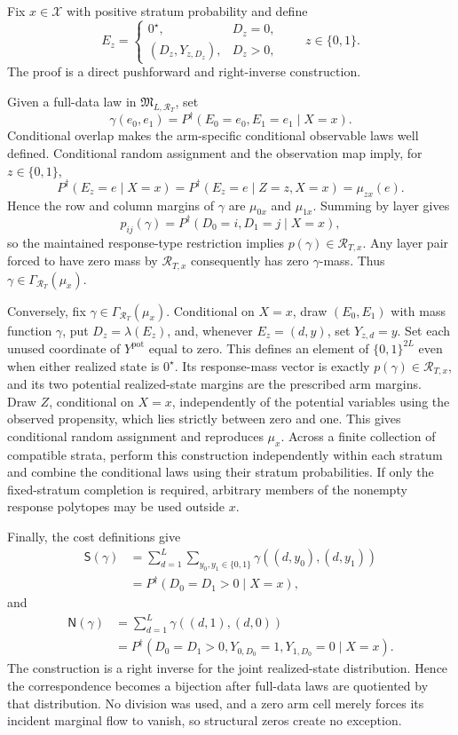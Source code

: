 Fix \(x\in\mathcal X\) with positive stratum probability and define
\[
 E_z=
 \begin{cases}
 0^{\star},&D_z=0,\\
 (D_z,Y_{z,D_z}),&D_z>0,
 \end{cases}
 \qquad z\in\{0,1\}.
\]
The proof is a direct pushforward and right-inverse construction.

Given a full-data law in \(\mathfrak M_{L,\mathcal R_T}\), set
\[
 \gamma(e_0,e_1)
 =P^{\dagger}(E_0=e_0,E_1=e_1\mid X=x).
\]
Conditional overlap makes the arm-specific conditional observable laws well defined.  Conditional random assignment and the observation map imply, for \(z\in\{0,1\}\),
\[
 P^{\dagger}(E_z=e\mid X=x)
 =P^{\dagger}(E_z=e\mid Z=z,X=x)
 =\mu_{zx}(e).
\]
Hence the row and column margins of \(\gamma\) are \(\mu_{0x}\) and \(\mu_{1x}\).  Summing by layer gives
\[
 p_{ij}(\gamma)
 =P^{\dagger}(D_0=i,D_1=j\mid X=x),
\]
so the maintained response-type restriction implies \(p(\gamma)\in\mathcal R_{T,x}\).  Any layer pair forced to have zero mass by \(\mathcal R_{T,x}\) consequently has zero \(\gamma\)-mass.  Thus \(\gamma\in\Gamma_{\mathcal R_T}(\mu_x)\).

Conversely, fix \(\gamma\in\Gamma_{\mathcal R_T}(\mu_x)\).  Conditional on \(X=x\), draw \((E_0,E_1)\) with mass function \(\gamma\), put \(D_z=\lambda(E_z)\), and, whenever \(E_z=(d,y)\), set \(Y_{z,d}=y\).  Set each unused coordinate of \(Y^{\mathrm{pot}}\) equal to zero.  This defines an element of \(\{0,1\}^{2L}\) even when either realized state is \(0^{\star}\).  Its response-mass vector is exactly \(p(\gamma)\in\mathcal R_{T,x}\), and its two potential realized-state margins are the prescribed arm margins.  Draw \(Z\), conditional on \(X=x\), independently of the potential variables using the observed propensity, which lies strictly between zero and one.  This gives conditional random assignment and reproduces \(\mu_x\).  Across a finite collection of compatible strata, perform this construction independently within each stratum and combine the conditional laws using their stratum probabilities.  If only the fixed-stratum completion is required, arbitrary members of the nonempty response polytopes may be used outside \(x\).

Finally, the cost definitions give
\[
 \begin{aligned}
 \mathsf S(\gamma)
 &=\sum_{d=1}^{L}\sum_{y_0,y_1\in\{0,1\}}
 \gamma((d,y_0),(d,y_1))\\
 &=P^{\dagger}(D_0=D_1>0\mid X=x),
 \end{aligned}
\]
and
\[
 \begin{aligned}
 \mathsf N(\gamma)
 &=\sum_{d=1}^{L}\gamma((d,1),(d,0))\\
 &=P^{\dagger}(D_0=D_1>0,
 Y_{0,D_0}=1,Y_{1,D_0}=0\mid X=x).
 \end{aligned}
\]
The construction is a right inverse for the joint realized-state distribution.  Hence the correspondence becomes a bijection after full-data laws are quotiented by that distribution.  No division was used, and a zero arm cell merely forces its incident marginal flow to vanish, so structural zeros create no exception.

